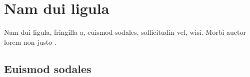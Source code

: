 \documentclass[12pt]{report}
\begin{document}
\clearpage
\linenumbers %
\modulolinenumbers[3] %
\chapter{Nam dui ligula} %
\lipsum[2-2] Nam dui ligula, fringilla a, euismod sodales, sollicitudin vel, wisi. Morbi
auctor lorem non justo \citep{lamport1986latex}.
\section{Euismod sodales}
\lipsum[2-3]









\end{document}
